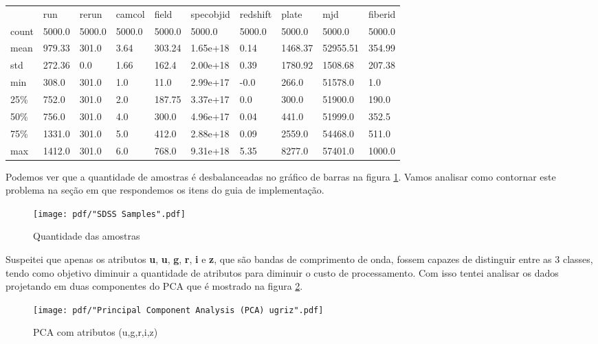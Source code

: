 \begin{table}[H]
\begin{tabular}{llllllllll}
      & run    & rerun  & camcol & field  & specobjid              & redshift & plate   & mjd      & fiberid \\
count & 5000.0 & 5000.0 & 5000.0 & 5000.0 & 5000.0                 & 5000.0   & 5000.0  & 5000.0   & 5000.0  \\
mean  & 979.33 & 301.0  & 3.64   & 303.24 & 1.65e+18 & 0.14        & 1468.37 & 52955.51 & 354.99  \\
std   & 272.36 & 0.0    & 1.66   & 162.4  & 2.00e+18 & 0.39        & 1780.92 & 1508.68  & 207.38  \\
min   & 308.0  & 301.0  & 1.0    & 11.0   & 2.99e+17            & -0.0     & 266.0   & 51578.0  & 1.0     \\
25\%  & 752.0  & 301.0  & 2.0    & 187.75 & 3.37e+17          & 0.0      & 300.0   & 51900.0  & 190.0   \\
50\%  & 756.0  & 301.0  & 4.0    & 300.0  & 4.96e+17            & 0.04     & 441.0   & 51999.0  & 352.5   \\
75\%  & 1331.0 & 301.0  & 5.0    & 412.0  & 2.88e+18            & 0.09     & 2559.0  & 54468.0  & 511.0   \\
max   & 1412.0 & 301.0  & 6.0    & 768.0  & 9.31e+18            & 5.35     & 8277.0  & 57401.0  & 1000.0 
\end{tabular}
\end{table}

Podemos ver que a quantidade de amostras é desbalanceadas no gráfico de barras na figura \ref{fig:samplesdss}. Vamos analisar como contornar este problema na seção em que respondemos os itens do guia de implementação.

\begin{figure}[H]
  \centering
  \texttt{[image: pdf/"SDSS Samples".pdf]}
  \caption{Quantidade das amostras}
  \label{fig:samplesdss}
\end{figure}

Suspeitei que apenas os atributos \textbf{u}, \textbf{u}, \textbf{g}, \textbf{r}, \textbf{i} e \textbf{z}, que 
são bandas de comprimento de onda, fossem capazes de distinguir entre as 3 classes, tendo como objetivo diminuir a
quantidade de atributos para diminuir o custo de processamento. Com isso tentei analisar os dados projetando em duas
componentes do PCA\cite{mackiewicz1993principal} que é mostrado na figura \ref{fig:pcaproj}.

\begin{figure}[H]
  \centering
  \texttt{[image: pdf/"Principal Component Analysis (PCA) ugriz".pdf]}
  \caption{PCA com atributos (u,g,r,i,z)}
  \label{fig:pcaproj}
\end{figure}

